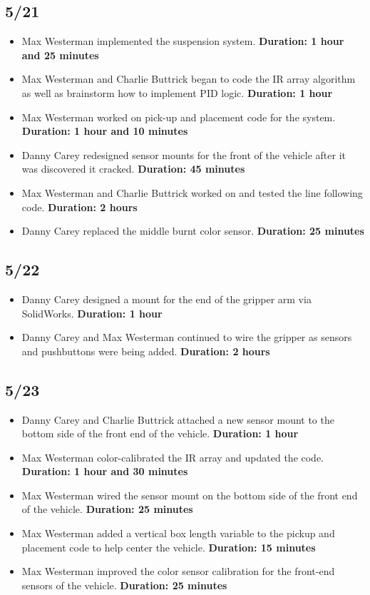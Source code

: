 \documentclass[12pt]{report}
\begin{document}
\subsection*{5/21}

\begin{itemize}
    \item Max Westerman implemented the suspension system. \textbf{Duration: 1 hour and 25 minutes}
    \item Max Westerman and Charlie Buttrick began to code the \gls{IR} array algorithm as well as brainstorm how to implement \gls{PID} logic. \textbf{Duration: 1 hour}
    \item Max Westerman worked on pick-up and placement code for the system. \textbf{Duration: 1 hour and 10 minutes}
    \item Danny Carey redesigned sensor mounts for the front of the vehicle after it was discovered it cracked. \textbf{Duration: 45 minutes}
    \item Max Westerman and Charlie Buttrick worked on and tested the line following code. \textbf{Duration: 2 hours}
    \item Danny Carey replaced the middle burnt color sensor. \textbf{Duration: 25 minutes}
\end{itemize}

\subsection*{5/22}

\begin{itemize}
    \item Danny Carey designed a mount for the end of the gripper arm via SolidWorks. \textbf{Duration: 1 hour}
    \item Danny Carey and Max Westerman continued to wire the gripper as sensors and pushbuttons were being added. \textbf{Duration: 2 hours}
\end{itemize}

\subsection*{5/23}

\begin{itemize}
    \item Danny Carey and Charlie Buttrick attached a new sensor mount to the bottom side of the front end of the vehicle. \textbf{Duration: 1 hour}
    \item Max Westerman color-calibrated the \gls{IR} array and updated the code. \textbf{Duration: 1 hour and 30 minutes}
    \item Max Westerman wired the sensor mount on the bottom side of the front end of the vehicle. \textbf{Duration: 25 minutes}
    \item Max Westerman added a vertical box length variable to the pickup and placement code to help center the vehicle. \textbf{Duration: 15 minutes}
    \item Max Westerman improved the color sensor calibration for the front-end sensors of the vehicle. \textbf{Duration: 25 minutes}
\end{itemize}
\end{document}
